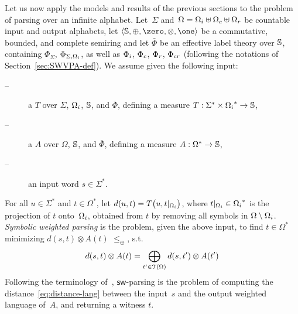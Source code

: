 Let us now apply the models and results of the previous sections %
to the problem of parsing over an infinite alphabet. %
%
%
Let~$\Sigma$ 
and~$\Omega = \Omegai \uplus \Omegac \uplus \Omegar$ 
be countable input and output alphabets,
let $\< \Semiring, \oplus, \zero, \otimes, \one>$ be a 
commutative, bounded, and complete  semiring  
and let $\bar\Phi$ be an effective label theory over $\mathbb{S}$,
containing $\Phi_\Sigma$, $\Phi_{\Sigma, \Omegai}$, as well as
$\Phii$, $\Phic$, $\Phir$, $\Phicr$
(following the notations of Section~\ref{sec:SWVPA-def}).
%
\noindent
We assume given the following input:
\begin{description}
\item[--] a \SWT $T$ over $\Sigma$, $\Omegai$, $\mathbb{S}$, and $\bar\Phi$, 
defining a measure %
$T: \Sigma^* \times \Omegai^* \to \Semiring$,

\item[--] a \SWVPA $A$ over $\Omega$, $\mathbb{S}$, and $\bar\Phi$,
defining a measure $A: \Omega^* \to \mathbb{S}$,
\item[--] an input word $s \in \Sigma^*$.
\end{description}
%
For all $u \in \Sigma^*$ and $t \in \Omega^*$, let 
\(d(u, t) = T\bigl(u, t|_\Omegai \bigr)\), 
where $t|_\Omegai \in \Omegai^*$ is the projection of $t$ onto~$\Omegai$,
obtained from $t$ by removing all symbols in $\Omega \setminus \Omegai$.
%
\noindent 
\emph{Symbolic weighted parsing} is the problem, 
given the above input, 
to find $t \in \Omega^*$ %
minimizing \( d(s, t) \otimes A(t)\)
\wrt $\leq_\oplus$, 
\ie s.t. %
%
\begin{equation}\label{eq:distance-lang}
d(s, t) \otimes A(t) = \displaystyle\bigoplus_{t' \in \mathcal{T}(\Omega)} d(s, t') \otimes A(t') 
\end{equation}
%
Following the terminology of~\cite{Mohri03EDWA}, 
$\textsf{sw}$-parsing is the problem of computing  
the distance~\eqref{eq:distance-lang} between the input~$s$ and the output weighted language of~$A$,
and returning a witness $t$. 
%
